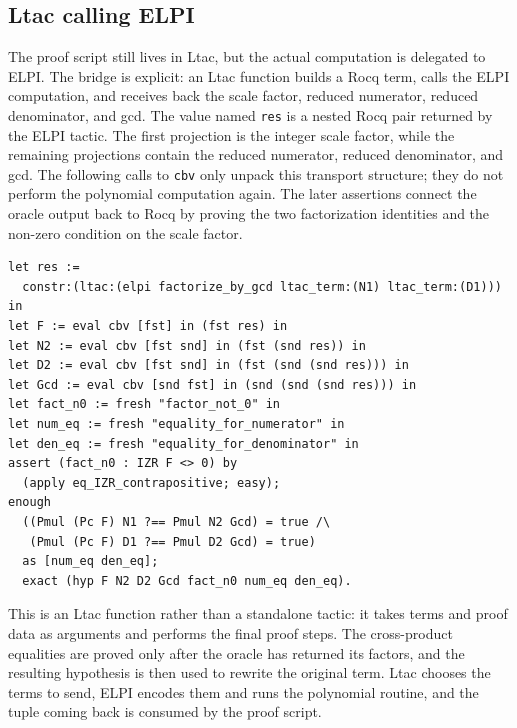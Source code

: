\documentclass[11pt]{article}
\begin{document}
\subsection{Ltac calling ELPI}
The proof script still lives in Ltac, but the actual computation is delegated to
ELPI. The bridge is explicit: an Ltac function builds a Rocq term, calls the
ELPI computation, and receives back the scale factor, reduced numerator, reduced denominator, and gcd.
The value named \texttt{res} is a nested Rocq pair returned by the ELPI tactic.
The first projection is the integer scale factor, while the remaining
projections contain the reduced numerator, reduced denominator, and gcd. The
following calls to \texttt{cbv} only unpack this transport structure; they do
not perform the polynomial computation again. The later assertions connect the
oracle output back to Rocq by proving the two factorization identities and the
non-zero condition on the scale factor.
\begin{lstlisting}
let res :=
  constr:(ltac:(elpi factorize_by_gcd ltac_term:(N1) ltac_term:(D1))) in
let F := eval cbv [fst] in (fst res) in
let N2 := eval cbv [fst snd] in (fst (snd res)) in
let D2 := eval cbv [fst snd] in (fst (snd (snd res))) in
let Gcd := eval cbv [snd fst] in (snd (snd (snd res))) in
let fact_n0 := fresh "factor_not_0" in
let num_eq := fresh "equality_for_numerator" in
let den_eq := fresh "equality_for_denominator" in
assert (fact_n0 : IZR F <> 0) by
  (apply eq_IZR_contrapositive; easy);
enough
  ((Pmul (Pc F) N1 ?== Pmul N2 Gcd) = true /\
   (Pmul (Pc F) D1 ?== Pmul D2 Gcd) = true)
  as [num_eq den_eq];
  exact (hyp F N2 D2 Gcd fact_n0 num_eq den_eq).
\end{lstlisting}
This is an Ltac function rather than a standalone tactic: it takes terms and
proof data as arguments and performs the final proof steps. The cross-product
equalities are proved only after the oracle has returned its factors, and the
resulting hypothesis is then used to rewrite the original term. Ltac chooses the
terms to send, ELPI encodes them and runs the polynomial routine, and the tuple
coming back is consumed by the proof script.

\end{document}
